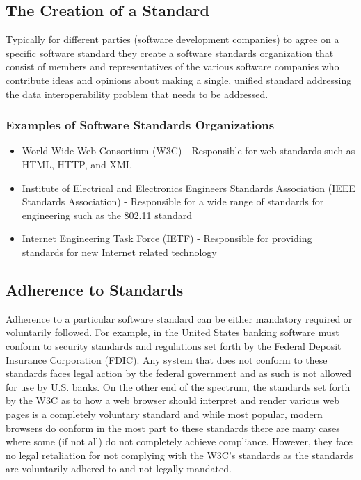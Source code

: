 \documentclass[14pt]{article}
\begin{document}
\subsection{The Creation of a Standard}
Typically for different parties (software development companies) to agree on a specific software standard they create a software standards organization that consist of members and representatives of the various software companies who contribute ideas and opinions about making a single, unified standard addressing the data \gls{interoperability} problem that needs to be addressed.

\subsubsection{Examples of Software Standards Organizations}

\begin{itemize}
\item World Wide Web Consortium (W3C) - Responsible for web standards such as HTML, HTTP, and XML 
\item Institute of Electrical and Electronics Engineers Standards Association (IEEE Standards Association) - Responsible for a wide range of standards for engineering such as the 802.11 standard
\item Internet Engineering Task Force (IETF) - Responsible for providing standards for new Internet related technology 
\end{itemize}

\subsection{Adherence to Standards}
Adherence to a particular software standard can be either mandatory required or voluntarily followed. For example, in the United States banking software must conform to security standards and regulations set forth by the Federal Deposit Insurance Corporation (FDIC). Any system that does not conform to these standards faces legal action by the federal government and as such is not allowed for use by U.S. banks. On the other end of the spectrum, the standards set forth by the W3C as to how a web browser should interpret and render various web pages is a completely voluntary standard and while most popular, modern browsers do conform in the most part to these standards there are many cases where some (if not all) do not completely achieve compliance. However, they face no legal retaliation for not complying with the W3C's standards as the standards are voluntarily adhered to and not legally mandated.
\end{document}
